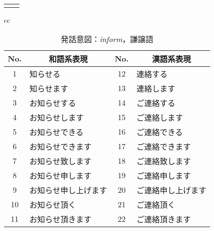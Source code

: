 \begin{table}[htbp]
\begin{center}
{\begin{tabular}{cc}
\begin{minipage}[t]{0.5\hsize}
\begin{center}
\end{center}
\end{minipage}
\end{tabular}
}
\end{center}
\end{table} 

\vspace{-2.5\baselineskip} 

\addtocounter{appndnum}{1}
\setcounter{table}{0}

\begin{table}[htbp]
\begin{center}
{ \scriptsize
\begin{tabular}{cc}
\begin{minipage}[t]{0.5\hsize}
\begin{center}


\caption{発話意図：{\it inform}，謙譲語} 
\label{tbl2:table3.1} 
\begin{tabular}{|c||l|c||l|} 
\hline 
No. & \multicolumn{1}{|c|}{和語系表現} & No. & \multicolumn{1}{|c|}{漢語系表現} \\
\hline 
1&	知らせる&			12&	連絡する \\
\hline 
2&	知らせます&		13&	連絡します \\
\hline 
3&	お知らせする&		14&	ご連絡する \\
\hline 
4&	お知らせします&		15&	ご連絡します \\
\hline 
5&	お知らせできる&		16&	ご連絡できる \\
\hline 
6&	お知らせできます&		17&	ご連絡できます \\
\hline 
7&	お知らせ致します&		18&	ご連絡致します \\
\hline 
8&	お知らせ申します&		19&	ご連絡申します \\
\hline 
9&	お知らせ申し上げます&	20&	ご連絡申し上げます \\
\hline 
10&	お知らせ頂く&		21&	ご連絡頂く \\
\hline 
11&	お知らせ頂きます&		22&	ご連絡頂きます \\
\hline 
\end{tabular} 

\end{center}
\end{minipage}
\begin{minipage}[t]{0.5\hsize}
\begin{center}




\end{center}
\end{minipage}
\end{tabular}}
\end{center}
\end{table}
